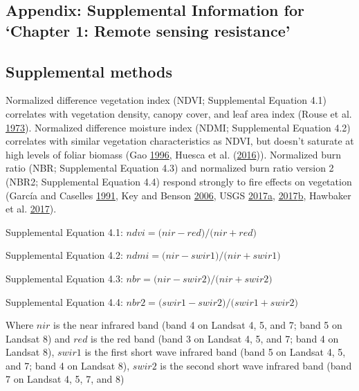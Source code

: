 \documentclass[twoside,12pt,final]{ucthesis-CA2012}
\begin{document}
\begin{ucmainmatter}
\chapter{\texorpdfstring{Appendix: Supplemental Information for `Chapter
1: Remote sensing
resistance'}{Appendix: Supplemental Information for Chapter 1: Remote sensing resistance}}\label{appendix-supplemental-information-for-chapter-1-remote-sensing-resistance}


\section{Supplemental methods}\label{supplemental-methods}

Normalized difference vegetation index (NDVI; Supplemental Equation 4.1)
correlates with vegetation density, canopy cover, and leaf area index
(Rouse et al. \protect\hyperlink{ref-rouse1973}{1973}). Normalized
difference moisture index (NDMI; Supplemental Equation 4.2) correlates
with similar vegetation characteristics as NDVI, but doesn't saturate at
high levels of foliar biomass (Gao
\protect\hyperlink{ref-gao1996}{1996}, Huesca et al.
(\protect\hyperlink{ref-huesca2016}{2016})). Normalized burn ratio (NBR;
Supplemental Equation 4.3) and normalized burn ratio version 2 (NBR2;
Supplemental Equation 4.4) respond strongly to fire effects on
vegetation (García and Caselles
\protect\hyperlink{ref-garcia1991}{1991}, Key and Benson
\protect\hyperlink{ref-key2006}{2006}, USGS
\protect\hyperlink{ref-usgs2017a}{2017}\protect\hyperlink{ref-usgs2017a}{a},
\protect\hyperlink{ref-usgs2017}{2017}\protect\hyperlink{ref-usgs2017}{b},
Hawbaker et al. \protect\hyperlink{ref-hawbaker2017}{2017}).

Supplemental Equation 4.1:
\(ndvi = \mathopen(nir - red\mathclose) / \mathopen(nir + red\mathclose)\)

Supplemental Equation 4.2:
\(ndmi = \mathopen(nir - swir1\mathclose) / \mathopen(nir + swir1\mathclose)\)

Supplemental Equation 4.3:
\(nbr = \mathopen(nir - swir2\mathclose) / \mathopen(nir + swir2\mathclose)\)

Supplemental Equation 4.4:
\(nbr2 = \mathopen(swir1 - swir2\mathclose) / \mathopen(swir1 + swir2\mathclose)\)

Where \(nir\) is the near infrared band (band 4 on Landsat 4, 5, and 7;
band 5 on Landsat 8) and \(red\) is the red band (band 3 on Landsat 4,
5, and 7; band 4 on Landsat 8), \(swir1\) is the first short wave
infrared band (band 5 on Landsat 4, 5, and 7; band 4 on Landsat 8),
\(swir2\) is the second short wave infrared band (band 7 on Landsat 4,
5, 7, and 8)


\end{ucmainmatter}
\end{document}
